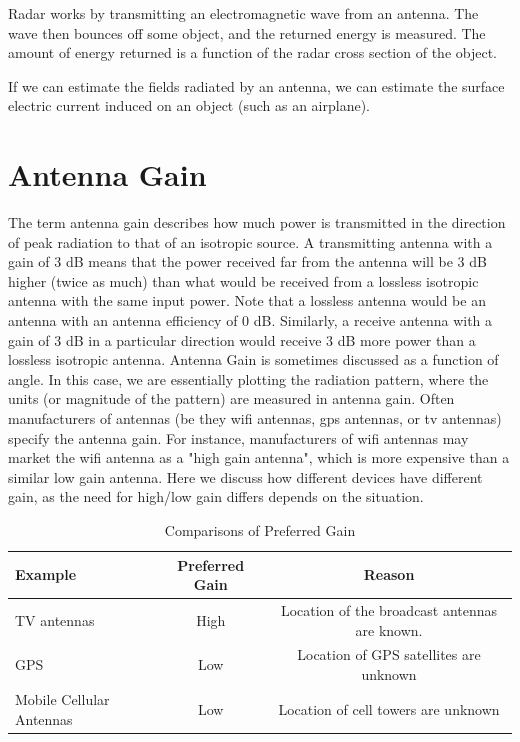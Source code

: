 \documentclass[a4paper,12pt]{report}
\begin{document}
Radar works by transmitting an electromagnetic wave from an antenna.
The wave then bounces off some object, and the returned energy is measured.
The amount of energy returned is a function of the radar cross section of the object.

If we can estimate the fields radiated by an antenna,
we can estimate the surface electric current induced on an object
(such as an airplane).

\section{Antenna Gain}

The term antenna gain describes how much power is transmitted
in the direction of peak radiation to that of an isotropic source.
A transmitting antenna with a gain of 3 dB means that the power received
far from the antenna will be 3 dB higher (twice as much) than
what would be received from a lossless isotropic antenna with the
same input power. Note that a lossless antenna would be an antenna
with an antenna efficiency of 0 dB.
Similarly, a receive antenna with a gain of 3 dB in a particular direction
would receive 3 dB more power than a lossless isotropic antenna.
Antenna Gain is sometimes discussed as a function of angle.
In this case, we are essentially plotting the radiation pattern,
where the units (or magnitude of the pattern) are measured in antenna gain.
Often manufacturers of antennas
(be they wifi antennas, gps antennas, or tv antennas) specify the antenna gain.
For instance, manufacturers of wifi antennas may market the wifi antenna as a "high gain antenna",
which is more expensive than a similar low gain antenna.
Here we discuss how different devices have different gain,
as the need for high/low gain differs depends on the situation.

\begin{table}[h]
  \centering
  \caption{Comparisons of Preferred Gain}
  \label{table}
  \begin{tabular}[]{lcc}
    \hline
    Example & Preferred Gain & Reason \\
    \hline\hline
    TV antennas & High & Location of the broadcast antennas are known. \\
    \hline
    GPS & Low & Location of GPS satellites are unknown \\
    \hline
    Mobile Cellular Antennas & Low & Location of cell towers are unknown \\
    \hline
  \end{tabular}
\end{table}
\end{document}
